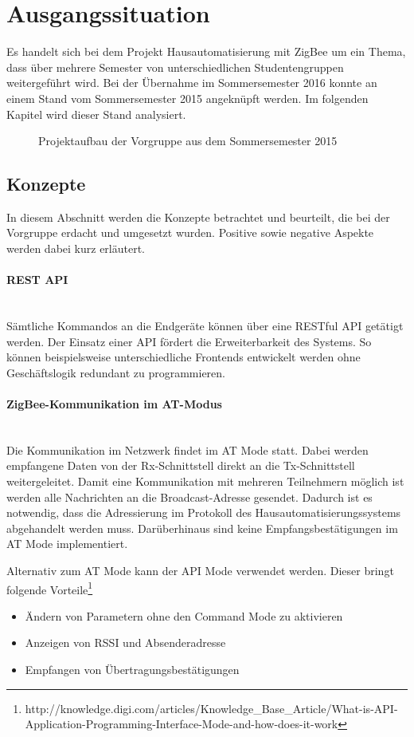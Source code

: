 \section{Ausgangssituation}
Es handelt sich bei dem Projekt Hausautomatisierung mit ZigBee um ein Thema, dass über mehrere Semester von unterschiedlichen Studentengruppen weitergeführt wird. Bei der Übernahme im Sommersemester 2016 konnte an einem Stand vom Sommersemester 2015 angeknüpft werden. Im folgenden Kapitel wird dieser Stand analysiert.
\begin{figure}[htb]
\centering
{}
\caption{Projektaufbau der Vorgruppe aus dem Sommersemester 2015}
\label{fig:Ausgang}
\end{figure}

\subsection{Konzepte}\label{Konzepte}
In diesem Abschnitt werden die Konzepte betrachtet und beurteilt, die bei der Vorgruppe erdacht und umgesetzt wurden. Positive sowie negative Aspekte werden dabei kurz erläutert.

\paragraph{REST API}\mbox{}\\
Sämtliche Kommandos an die Endgeräte können über eine RESTful API getätigt werden. Der Einsatz einer API fördert die Erweiterbarkeit des Systems. So können beispielsweise unterschiedliche Frontends entwickelt werden ohne Geschäftslogik redundant zu programmieren.

\paragraph{ZigBee-Kommunikation im AT-Modus}\label{AusgZigBee}\mbox{}\\
Die Kommunikation im Netzwerk findet im \ac{AT Mode} statt. Dabei werden empfangene Daten von der \ac{Rx-Schnittstell} direkt an die \ac{Tx-Schnittstell} weitergeleitet. Damit eine Kommunikation mit mehreren Teilnehmern möglich ist werden alle Nachrichten an die Broadcast-Adresse gesendet. Dadurch ist es notwendig, dass die Adressierung im Protokoll des Hausautomatisierungssystems abgehandelt werden muss. Darüberhinaus sind keine Empfangsbestätigungen im \ac{AT Mode} implementiert. 

Alternativ zum \ac{AT Mode} kann der \ac{API Mode} verwendet werden. Dieser bringt folgende Vorteile\footnote{http://knowledge.digi.com/articles/Knowledge\_Base\_Article/What-is-API-Application-Programming-Interface-Mode-and-how-does-it-work}
\begin{itemize}
\item Ändern von Parametern ohne den Command Mode zu aktivieren
\item Anzeigen von RSSI und Absenderadresse
\item Empfangen von Übertragungsbestätigungen
\end{itemize}

